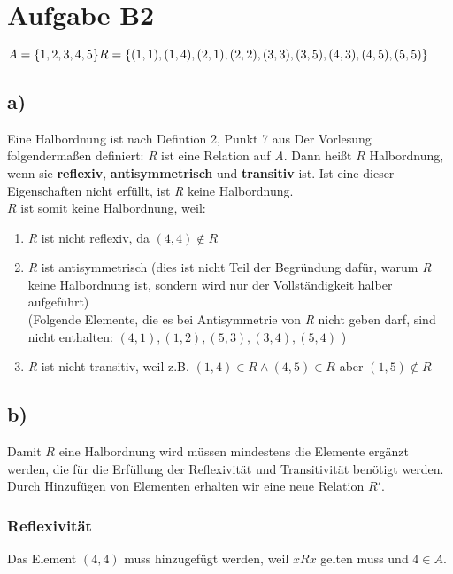 \documentclass[11pt,a4paper]{article}
\begin{document}
\section*{Aufgabe B2}

\begin{math}
A = \{1,2,3,4,5\} \\
R = \{ (1,1), (1,4), (2,1), (2,2), (3,3), (3,5), (4,3), (4,5), (5,5) \}
\end{math}


\subsection*{a)}
Eine Halbordnung ist nach Defintion 2, Punkt 7 aus Der Vorlesung folgendermaßen definiert: \emph{R} ist eine Relation auf \emph{A}. Dann heißt $R$ Halbordnung, wenn sie \textbf{reflexiv}, \textbf{antisymmetrisch} und \textbf{transitiv} ist. Ist eine dieser Eigenschaften nicht erfüllt, ist \emph{R} keine Halbordnung. \\
\(R\) ist somit keine Halbordnung, weil:
\begin{enumerate}
\item \emph{R} ist nicht reflexiv, da \( (4,4) \notin R \)
\item \emph{R} ist antisymmetrisch (dies ist nicht Teil der Begründung dafür, warum \emph{R} keine Halbordnung ist, sondern wird nur der Vollständigkeit halber aufgeführt) \\
(Folgende Elemente, die es bei Antisymmetrie von \emph{R} nicht geben darf, sind nicht enthalten: \((4,1),(1,2),(5,3),(3,4),(5,4)\) )
\item \emph{R} ist nicht transitiv, weil z.B. \( (1,4) \in R \land (4,5) \in R \) aber \((1,5) \notin R\)
\end{enumerate}

\subsection*{b)}
Damit \(R\) eine Halbordnung wird müssen mindestens die Elemente ergänzt werden, die für die Erfüllung der Reflexivität und Transitivität benötigt werden. Durch Hinzufügen von Elementen erhalten wir eine neue Relation $R'$.
\subsubsection*{Reflexivität}
    Das Element \((4,4)\) muss hinzugefügt werden, weil \(xRx\) gelten muss und  \(4 \in A\).
\end{document}
